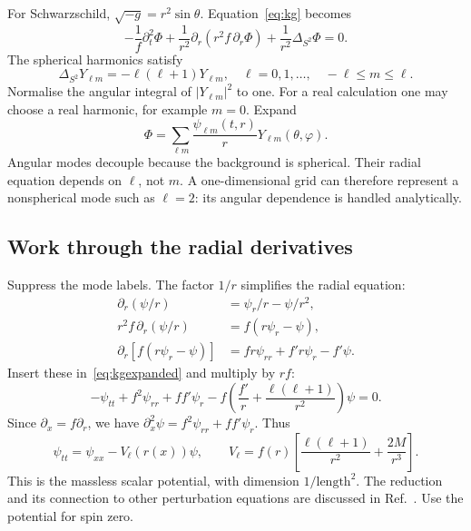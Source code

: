 \documentclass[11pt,a4paper]{article}
\numberwithin{equation}{section}
\newcommand{\pd}{\partial}
\begin{document}
For Schwarzschild, $\sqrt{-g}=r^2\sin\theta$. Equation~\eqref{eq:kg} becomes
\begin{equation}\label{eq:kgexpanded}
 -\frac1f\pd_t^2\Phi+
 \frac1{r^2}\pd_r(r^2f\,\pd_r\Phi)
 +\frac1{r^2}\Delta_{S^2}\Phi=0.
\end{equation}
The spherical harmonics satisfy
\begin{equation}
 \Delta_{S^2}Y_{\ell m}=-\ell(\ell+1)Y_{\ell m},\quad
 \ell=0,1,\ldots,\quad -\ell\leq m\leq\ell .
\end{equation}
Normalise the angular integral of $|Y_{\ell m}|^2$ to one. For a real
calculation one may choose a real harmonic, for example $m=0$. Expand
\begin{equation}\label{eq:decomp}
 \Phi=\sum_{\ell m}\frac{\psi_{\ell m}(t,r)}rY_{\ell m}(\theta,\varphi).
\end{equation}
Angular modes decouple because the background is spherical. Their radial
equation depends on $\ell$, not $m$. A one-dimensional grid can therefore
represent a nonspherical mode such as $\ell=2$: its angular dependence is
handled analytically.

\subsection{Work through the radial derivatives}
Suppress the mode labels. The factor $1/r$ simplifies the radial equation:
\begin{align}
 \pd_r(\psi/r)&=\psi_r/r-\psi/r^2,\\
 r^2f\,\pd_r(\psi/r)&=f(r\psi_r-\psi),\\
 \pd_r[f(r\psi_r-\psi)]&=fr\psi_{rr}+f'r\psi_r-f'\psi .
\end{align}
Insert these in~\eqref{eq:kgexpanded} and multiply by $rf$:
\begin{equation}
 -\psi_{tt}+f^2\psi_{rr}+ff'\psi_r
 -f\left(\frac{f'}r+\frac{\ell(\ell+1)}{r^2}\right)\psi=0 .
\end{equation}
Since $\pd_x=f\pd_r$, we have
$\pd_x^2\psi=f^2\psi_{rr}+ff'\psi_r$. Thus
\begin{equation}\label{eq:master}
 \boxed{\ \psi_{tt}=\psi_{xx}-V_\ell(r(x))\psi,\qquad
 V_\ell=f(r)\left[\frac{\ell(\ell+1)}{r^2}+\frac{2M}{r^3}\right].\ }
\end{equation}
This is the massless scalar potential, with dimension
$1/\text{length}^2$. The reduction and its connection to other perturbation
equations are discussed in Ref.~\cite{berti}. Use the potential for spin zero.
\end{document}
